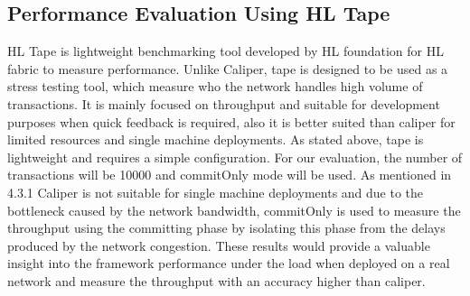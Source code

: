 \subsection{Performance Evaluation Using HL Tape}
HL Tape is lightweight benchmarking tool developed by HL foundation for HL fabric to measure performance. Unlike Caliper, tape is designed
to be used as a stress testing tool, which measure who the network handles high volume of transactions. It is mainly focused on throughput
and suitable for development purposes when quick feedback is required, also it is better suited than caliper for limited resources and
single machine deployments. As stated above, tape is lightweight and requires a simple configuration. For our evaluation, the number of
transactions will be 10000 and commitOnly mode will be used. As mentioned in 4.3.1 Caliper is not suitable for single machine deployments
and due to the bottleneck caused by the network bandwidth, commitOnly is used to measure the throughput using the committing phase by
isolating this phase from the delays produced by the network congestion. These results would provide a valuable insight into the framework
performance under the load when deployed on a real network and measure the throughput with an accuracy higher than caliper.
